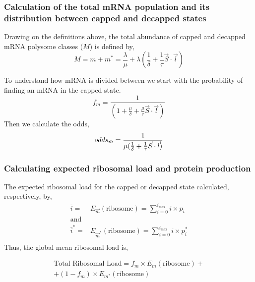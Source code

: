 \documentclass[a4,center,fleqn]{NAR}
\newcommand{\imax}{\ensuremath{{i_{\max}}}\xspace}
\newcommand{\mvec}{\ensuremath{\vec{m}}\xspace}
\newcommand{\mvecstar}{\ensuremath{\mvec^*}\xspace}
\newcommand{\msum}{\ensuremath{m}\xspace}
\newcommand{\msumstar}{\ensuremath{m^*}\xspace}
\newcommand{\msumtot}{\ensuremath{M}\xspace}
\newcommand{\mfrac}{\ensuremath{f_m}\xspace}
\newcommand{\ribosome}{\ensuremath{\text{ribosome}}} %
\newcommand{\MRL}{\ensuremath{\bar{i}}\xspace}
\begin{document}
\subsubsection{Calculation of the total mRNA population and its distribution between capped and decapped states}
Drawing on the definitions above, the total abundance of capped and decapped mRNA polysome classes ($\msumtot$) is defined by,
\begin{equation}
	\msumtot = \msum + \msumstar = \frac{\lambda}{\mu} +  \lambda(\frac{1}{\delta} + \frac{1}{\tau}\vec{S} \cdot \vec{l})
\end{equation}

To understand how mRNA is divided  between we start with the probability of finding an mRNA in the capped state.
\begin{equation*}
	\mfrac = \frac{1}{(1  + \frac{\mu}{\delta} + \frac{\mu}{\tau}\vec{S} \cdot \vec{l})}	
\end{equation*}
Then we calculate the odds,
\begin{equation}\label{eq:odds}
	odds_{\hat{m}} = \frac{1}{\mu(\frac{1}{\delta} + \frac{1}{\tau}\vec{S} \cdot \vec{l})} \\
\end{equation}


\subsubsection{Calculating expected ribosomal load and protein production}
The expected ribosomal load for the capped or decapped state calculated, respectively, by,
\begin{align}\label{eq:Expected_ribo_load}
  \MRL =& E_{\mvec}\left(\ribosome\right) =\sum_{i=0}^{\imax}i \times p_{i} \\ \nonumber
   \text{and}&\\ \nonumber
   \MRL^* =& E_{\mvecstar}\left(\ribosome\right) =\sum_{i=0}^{\imax}i \times p^*_{i}\\ \nonumber
\end{align}
Thus, the global mean ribosomal load is,

\begin{align}\label{eq:System_ribo_load}
	\text{Total Ribosomal Load} = \mfrac\times E_{\msum} \left(\ribosome\right) +\\
          + (1-\mfrac)\times E_{\msumstar}\left(\ribosome\right)
\end{align}


%
\end{document}
